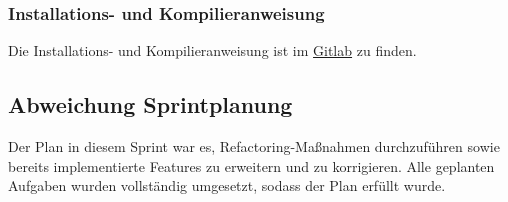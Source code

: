 \documentclass[a4paper,11pt]{article}
\begin{document}
\subsubsection*{Installations- und Kompilieranweisung}
Die Installations- und Kompilieranweisung ist im \href{https://git.informatik.uni-rostock.de/softwaretechnik-ws-2025-26/uebung3/team3/projekt-team3-uebung3/-/blob/main/README.md?ref_type=heads}{Gitlab} zu finden.

\subsection{Abweichung Sprintplanung}
Der Plan in diesem Sprint war es, Refactoring-Maßnahmen durchzuführen sowie bereits implementierte Features zu erweitern und zu korrigieren. Alle geplanten Aufgaben wurden vollständig umgesetzt, sodass der Plan erfüllt wurde.
\end{document}

